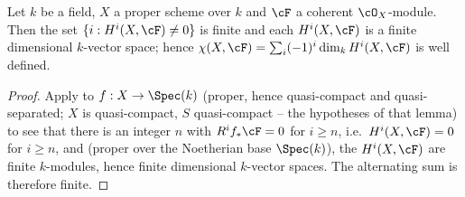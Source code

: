 \begin{lemma}
\label{lem:pc-euler-characteristic-well-defined}
Let $k$ be a field, $X$ a proper scheme over $k$ and $\cF$ a coherent
$\cO_X$-module.  Then the set
$\{i:H^i(X,\cF)\neq0\}$ is finite and each $H^i(X,\cF)$ is a finite
dimensional $k$-vector space; hence
$\chi(X,\cF)=\sum_i(-1)^i\dim_kH^i(X,\cF)$ is well defined.
\end{lemma}
\begin{proof}
Apply  to $f:X\to\Spec(k)$ (proper, hence
quasi-compact and quasi-separated; $X$ is quasi-compact, $S$ quasi-compact
-- the hypotheses of that lemma) to see that there is an integer $n$ with
$R^if_*\cF=0$ for $i\ge n$, i.e.\ $H^i(X,\cF)=0$ for $i\ge n$, and
 (proper over the Noetherian base
$\Spec(k)$), the $H^i(X,\cF)$ are finite $k$-modules, hence finite
dimensional $k$-vector spaces.  The alternating sum is therefore
finite.
\end{proof}

